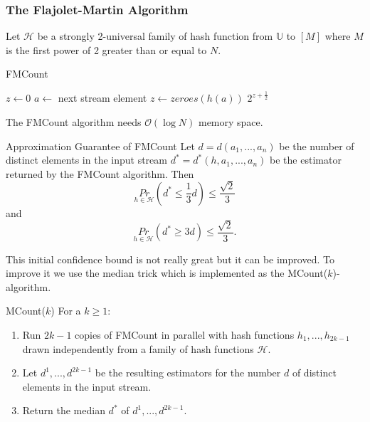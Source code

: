 \documentclass{panikzettel}
\begin{document}
\subsubsection{The Flajolet-Martin Algorithm}
Let $\mathcal{H}$ be a strongly 2-universal family of hash function from $\mathbb{U}$ to $[M]$ where $M$ is the first power of 2 greater than or equal to $N$.

\begin{halfboxl}
\vspace{-\baselineskip}
	\begin{algo}{FMCount}
	{
	\renewcommand{\algorithmicrequire}{\textbf{Input:}}
	\renewcommand{\algorithmicensure}{\textbf{Output:}}
	  \begin{algorithmic}[1]
	  \State $z\leftarrow 0$
	  	\State $a\leftarrow$ next stream element
	    \State $z\leftarrow zeroes(h(a))$
	    \EndIf
	  \EndWhile
	  \State \Return $2^{z+\frac{1}{2}}$
	  \end{algorithmic}
	}
	\end{algo}

	The FMCount algorithm needs $\mathcal{O}(\log N)$ memory space.
\end{halfboxl}
\begin{halfboxr}
	\vspace{-\baselineskip}
	\begin{theo}{Approximation Guarantee of FMCount}
	Let $d=d(a_1,...,a_n)$ be the number of distinct elements in the input stream $d^*=d^*(h,a_1,...,a_n)$ be the estimator returned by the FMCount algorithm. Then
	\[
	\underset{h\in\mathcal{H}}{Pr} \left(d^*\leq \frac{1}{3}d\right) \leq \frac{\sqrt{2}}{3}
	\]
	and
	\[
	\underset{h\in\mathcal{H}}{Pr}(d^* \geq 3d)\leq \frac{\sqrt{2}}{3}.
	\]
	\end{theo}
\end{halfboxr}

This initial confidence bound is not really great but it can be improved. To improve it we use the median trick which is implemented as the MCount($k$)-algorithm.


\begin{algo}{MCount($k$)}
For a $k\geq 1$:
\begin{enumerate}
\item Run $2k-1$ copies of FMCount in parallel with hash functions $h_1,...,h_{2k-1}$ drawn independently from a family of hash functions $\mathcal{H}$.
\item Let $d^1,...,d^{2k-1}$ be the resulting estimators for the number $d$ of distinct elements in the input stream.
\item Return the median $d^*$ of $d^1,...,d^{2k-1}$.
\end{enumerate}
\end{algo}
\end{document}
